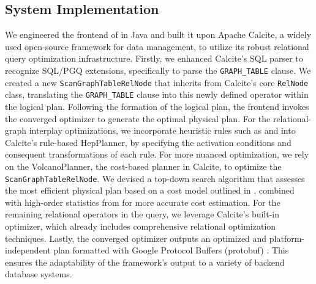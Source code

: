 \subsection{System Implementation}
We engineered the frontend of \name in Java and built it upon Apache Calcite, a widely used open-source framework for data management, to utilize its robust relational query optimization infrastructure.
Firstly, we enhanced Calcite's SQL parser to recognize SQL/PGQ extensions, specifically to parse the \lstinline{GRAPH_TABLE} clause.
We created a new \lstinline{ScanGraphTableRelNode} that inherits from Calcite's core \lstinline{RelNode} class, translating the \lstinline{GRAPH_TABLE} clause into this newly defined operator within the logical plan.
Following the formation of the logical plan, the frontend invokes the converged optimizer to generate the optimal physical plan.
For the relational-graph interplay optimizations, we incorporate heuristic rules such as \filterrule and \joinfuserule into Calcite's rule-based HepPlanner, by specifying the activation conditions and consequent transformations of each rule.
For more nuanced optimization, we rely on the VolcanoPlanner, the cost-based planner in Calcite, to optimize the \lstinline{ScanGraphTableRelNode}.
We devised a top-down search algorithm that assesses the most efficient physical plan based on a cost model outlined in , combined with high-order statistics from \glogue for more accurate cost estimation.
For the remaining relational operators in the query, we leverage Calcite's built-in optimizer, which already includes comprehensive relational optimization techniques.
Lastly, the converged optimizer outputs an optimized and platform-independent plan formatted with Google Protocol Buffers (protobuf) \cite{protobuf}. This ensures the adaptability of the \name framework's output to a variety of backend database systems.

